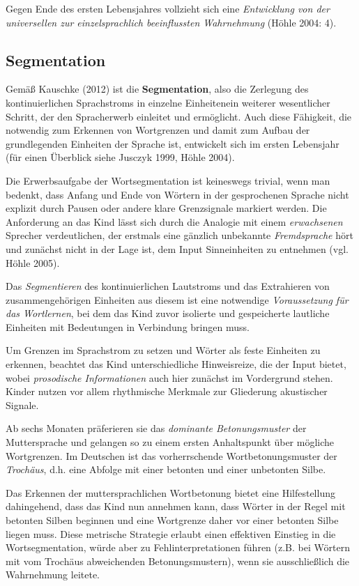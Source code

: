\documentclass[
  letterpaper,
]{scrbook}
\begin{document}
Gegen Ende des ersten Lebensjahres vollzieht sich eine \emph{Entwicklung
von der universellen zur einzelsprachlich beeinflussten Wahrnehmung}
(Höhle 2004: 4).

\hypertarget{segmentation}{%
\subsection{Segmentation}\label{segmentation}}

Gemäß Kauschke (2012) ist die \textbf{Segmentation}, also die Zerlegung
des kontinuierlichen Sprachstroms in einzelne Einheitenein weiterer
wesentlicher Schritt, der den Spracherwerb einleitet und ermöglicht.
Auch diese Fähigkeit, die notwendig zum Erkennen von Wortgrenzen und
damit zum Aufbau der grundlegenden Einheiten der Sprache ist, entwickelt
sich im ersten Lebensjahr (für einen Überblick siehe Jusczyk 1999, Höhle
2004).

Die Erwerbsaufgabe der Wortsegmentation ist keineswegs trivial, wenn man
bedenkt, dass Anfang und Ende von Wörtern in der gesprochenen Sprache
nicht explizit durch Pausen oder andere klare Grenzsignale markiert
werden. Die Anforderung an das Kind lässt sich durch die Analogie mit
einem \emph{erwachsenen} Sprecher verdeutlichen, der erstmals eine
gänzlich unbekannte \emph{Fremdsprache} hört und zunächst nicht in der
Lage ist, dem Input Sinneinheiten zu entnehmen (vgl. Höhle 2005).

Das \emph{Segmentieren} des kontinuierlichen Lautstroms und das
Extrahieren von zusammengehörigen Einheiten aus diesem ist eine
notwendige \emph{Voraussetzung für das Wortlernen}, bei dem das Kind
zuvor isolierte und gespeicherte lautliche Einheiten mit Bedeutungen in
Verbindung bringen muss.

Um Grenzen im Sprachstrom zu setzen und Wörter als feste Einheiten zu
erkennen, beachtet das Kind unterschiedliche Hinweisreize, die der Input
bietet, wobei \emph{prosodische Informationen} auch hier zunächst im
Vordergrund stehen. Kinder nutzen vor allem rhythmische Merkmale zur
Gliederung akustischer Signale.

Ab sechs Monaten präferieren sie das \emph{dominante Betonungsmuster}
der Muttersprache und gelangen so zu einem ersten Anhaltspunkt über
mögliche Wortgrenzen. Im Deutschen ist das vorherrschende
Wortbetonungsmuster der \emph{Trochäus}, d.h. eine Abfolge mit einer
betonten und einer unbetonten Silbe.

Das Erkennen der muttersprachlichen Wortbetonung bietet eine
Hilfestellung dahingehend, dass das Kind nun annehmen kann, dass Wörter
in der Regel mit betonten Silben beginnen und eine Wortgrenze daher vor
einer betonten Silbe liegen muss. Diese metrische Strategie erlaubt
einen effektiven Einstieg in die Wortsegmentation, würde aber zu
Fehlinterpretationen führen (z.B. bei Wörtern mit vom Trochäus
abweichenden Betonungsmustern), wenn sie ausschließlich die Wahrnehmung
leitete.
\end{document}
